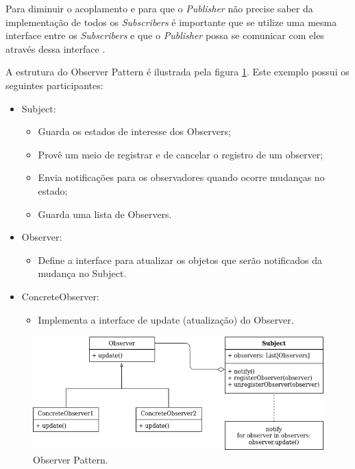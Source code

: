 Para diminuir o acoplamento e para que o \textit{Publisher} não precise saber da implementação de todos os \textit{Subscribers} é importante que se utilize uma mesma interface entre os \textit{Subscribers} e que o \textit{Publisher} possa se comunicar com eles através dessa interface \cite{observer}.

A estrutura do Observer Pattern é ilustrada pela figura \ref{fig:observer}. Este exemplo possui os seguintes participantes:
\begin{itemize}
    \item Subject:
        \begin{itemize}
            \item Guarda os estados de interesse dos Observers;
            \item Provê um meio de registrar e de cancelar o registro de um observer;
            \item Envia notificações para os observadores quando ocorre mudanças no estado;
            \item Guarda uma lista de Observers.
        \end{itemize}
    \item Observer:
        \begin{itemize}
            \item Define a interface para atualizar os objetos que serão notificados da mudança no Subject.
        \end{itemize}
    \item ConcreteObserver:
        \begin{itemize}
            \item Implementa a interface de update (atualização) do Observer.
        \end{itemize}
\end{itemize}

\begin{figure}
\centering
\includegraphics[width=\textwidth]{imagens/observer.png}
\caption{Observer Pattern.} 
\label{fig:observer}
\end{figure}

